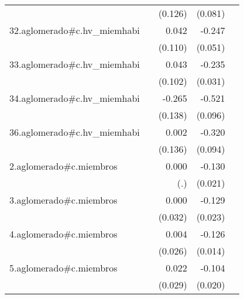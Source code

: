 {\begin{longtable}{l*{4}{D{.}{.}{-1}}}
            &                     &     (0.126)         &     (0.081)         &                     \\
\addlinespace
32.aglomerado#c.hv\_miemhabi&                     &       0.042         &      -0.247\sym{***}&                     \\
            &                     &     (0.110)         &     (0.051)         &                     \\
\addlinespace
33.aglomerado#c.hv\_miemhabi&                     &       0.043         &      -0.235\sym{***}&                     \\
            &                     &     (0.102)         &     (0.031)         &                     \\
\addlinespace
34.aglomerado#c.hv\_miemhabi&                     &      -0.265         &      -0.521\sym{***}&                     \\
            &                     &     (0.138)         &     (0.096)         &                     \\
\addlinespace
36.aglomerado#c.hv\_miemhabi&                     &       0.002         &      -0.320\sym{***}&                     \\
            &                     &     (0.136)         &     (0.094)         &                     \\
\addlinespace
2.aglomerado#c.miembros&                     &       0.000         &      -0.130\sym{***}&                     \\
            &                     &         (.)         &     (0.021)         &                     \\
\addlinespace
3.aglomerado#c.miembros&                     &       0.000         &      -0.129\sym{***}&                     \\
            &                     &     (0.032)         &     (0.023)         &                     \\
\addlinespace
4.aglomerado#c.miembros&                     &       0.004         &      -0.126\sym{***}&                     \\
            &                     &     (0.026)         &     (0.014)         &                     \\
\addlinespace
5.aglomerado#c.miembros&                     &       0.022         &      -0.104\sym{***}&                     \\
            &                     &     (0.029)         &     (0.020)         &                     \\

\end{longtable}}
